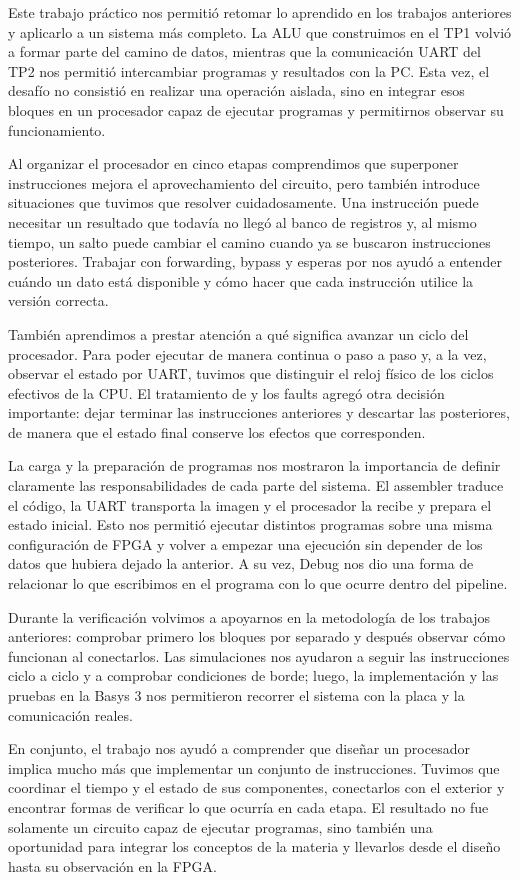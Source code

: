 Este trabajo práctico nos permitió retomar lo aprendido en los trabajos
anteriores y aplicarlo a un sistema más completo. La ALU que construimos en el
TP1 volvió a formar parte del camino de datos, mientras que la comunicación
UART del TP2 nos permitió intercambiar programas y resultados con la PC. Esta
vez, el desafío no consistió en realizar una operación aislada, sino en integrar
esos bloques en un procesador capaz de ejecutar programas y permitirnos observar
su funcionamiento.

Al organizar el procesador en cinco etapas comprendimos que superponer
instrucciones mejora el aprovechamiento del circuito, pero también introduce
situaciones que tuvimos que resolver cuidadosamente. Una instrucción puede
necesitar un resultado que todavía no llegó al banco de registros y, al mismo
tiempo, un salto puede cambiar el camino cuando ya se buscaron instrucciones
posteriores. Trabajar con forwarding, bypass y esperas por  nos
ayudó a entender cuándo un dato está disponible y cómo hacer que cada
instrucción utilice la versión correcta.

También aprendimos a prestar atención a qué significa avanzar un ciclo del
procesador. Para poder ejecutar de manera continua o paso a paso y, a la vez,
observar el estado por UART, tuvimos que distinguir el reloj físico de los
ciclos efectivos de la CPU. El tratamiento de  y los faults agregó
otra decisión importante: dejar terminar las instrucciones anteriores y
descartar las posteriores, de manera que el estado final conserve los efectos
que corresponden.

La carga y la preparación de programas nos mostraron la importancia de definir
claramente las responsabilidades de cada parte del sistema. El assembler
traduce el código, la UART transporta la imagen y el procesador la recibe y
prepara el estado inicial. Esto nos permitió ejecutar distintos programas sobre
una misma configuración de FPGA y volver a empezar una ejecución sin depender
de los datos que hubiera dejado la anterior. A su vez, Debug nos dio una forma
de relacionar lo que escribimos en el programa con lo que ocurre dentro del
pipeline.

Durante la verificación volvimos a apoyarnos en la metodología de los trabajos
anteriores: comprobar primero los bloques por separado y después observar cómo
funcionan al conectarlos. Las simulaciones nos ayudaron a seguir las
instrucciones ciclo a ciclo y a comprobar condiciones de borde; luego, la
implementación y las pruebas en la Basys 3 nos permitieron recorrer el sistema
con la placa y la comunicación reales.

En conjunto, el trabajo nos ayudó a comprender que diseñar un procesador
implica mucho más que implementar un conjunto de instrucciones. Tuvimos que
coordinar el tiempo y el estado de sus componentes, conectarlos con el exterior
y encontrar formas de verificar lo que ocurría en cada etapa. El resultado no
fue solamente un circuito capaz de ejecutar programas, sino también una
oportunidad para integrar los conceptos de la materia y llevarlos desde el
diseño hasta su observación en la FPGA.
